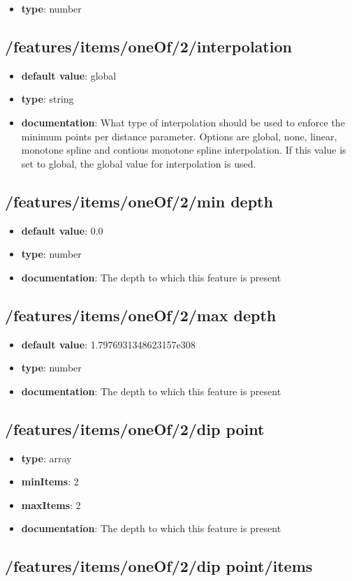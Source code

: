 \begin{itemize}\item {\bf type}: number
\end{itemize}\subsection{/features/items/oneOf/2/interpolation}
\begin{itemize}\item {\bf default value}: global
\item {\bf type}: string
\item {\bf documentation}: What type of interpolation should be used to enforce the minimum points per distance parameter. Options are global, none, linear, monotone spline and contious monotone spline interpolation. If this value is set to global, the global value for interpolation is used.
\end{itemize}\subsection{/features/items/oneOf/2/min depth}
\begin{itemize}\item {\bf default value}: 0.0
\item {\bf type}: number
\item {\bf documentation}: The depth to which this feature is present
\end{itemize}\subsection{/features/items/oneOf/2/max depth}
\begin{itemize}\item {\bf default value}: 1.7976931348623157e308
\item {\bf type}: number
\item {\bf documentation}: The depth to which this feature is present
\end{itemize}\subsection{/features/items/oneOf/2/dip point}
\begin{itemize}\item {\bf type}: array
\item {\bf minItems}: 2
\item {\bf maxItems}: 2
\item {\bf documentation}: The depth to which this feature is present
\end{itemize}\subsection{/features/items/oneOf/2/dip point/items}
